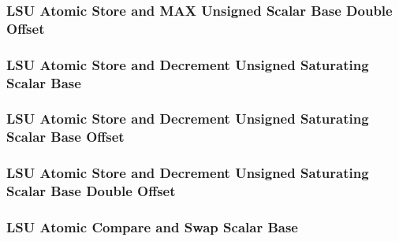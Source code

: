 \subsubsection[{\small LSU Atomic Store and MAX Unsigned Scalar Base Double Offset}]{LSU Atomic Store and MAX Unsigned Scalar Base Double Offset} \label{sec:format-LSU-ASMAXUSB.D}



\subsubsection[{\small LSU Atomic Store and Decrement Unsigned Saturating Scalar Base}]{LSU Atomic Store and Decrement Unsigned Saturating Scalar Base} \label{sec:format-LSU-ASDUSSB}



\subsubsection[{\small LSU Atomic Store and Decrement Unsigned Saturating Scalar Base Offset}]{LSU Atomic Store and Decrement Unsigned Saturating Scalar Base Offset} \label{sec:format-LSU-ASDUSSB.O}



\subsubsection[{\small LSU Atomic Store and Decrement Unsigned Saturating Scalar Base Double Offset}]{LSU Atomic Store and Decrement Unsigned Saturating Scalar Base Double Offset} \label{sec:format-LSU-ASDUSSB.D}



\subsubsection[{\small LSU Atomic Compare and Swap Scalar Base}]{LSU Atomic Compare and Swap Scalar Base} \label{sec:format-LSU-ACSWAPSB}

